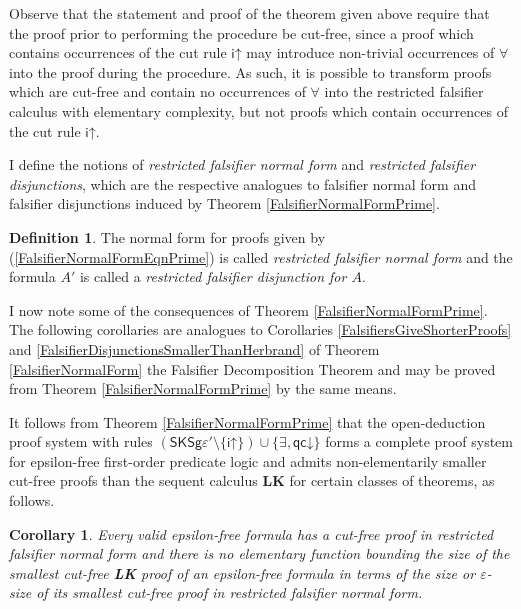 \documentclass[10pt]{article}
\newtheorem{corollary}[theorem]{Corollary}
\theoremstyle{definition}\newtheorem{remark}[theorem]{Remark}
\theoremstyle{definition}\newtheorem{example}[theorem]{Example}
\theoremstyle{definition}\newtheorem{definition}[theorem]{Definition}
\newcommand{\FalsifierCalculusPrime}{{\mathsf{SKSg\varepsilon'}}}
\newcommand{\iUp}{{\mathsf{i\mathord\uparrow}}}
\newcommand{\qcDown}{{\mathsf{qc\mathord\downarrow}}}
\begin{document}
	Observe that the statement and proof of the theorem given above require that the proof prior to performing the procedure be cut-free, since a proof which contains occurrences of the cut rule $\iUp$ may introduce non-trivial occurrences of $\forall$ into the proof during the procedure. As such, it is possible to transform proofs which are cut-free and contain no occurrences of $\forall$ into the restricted falsifier calculus with elementary complexity, but not proofs which contain occurrences of the cut rule $\iUp$.

	I define the notions of \textit{restricted falsifier normal form} and \textit{restricted falsifier disjunctions}, which are the respective analogues to falsifier normal form and falsifier disjunctions induced by Theorem \ref{FalsifierNormalFormPrime}.
	
	\begin{definition}\label{RestrictedFalsifierNormalForm}
		The normal form for proofs given by (\ref{FalsifierNormalFormEqnPrime}) is called \textit{restricted falsifier normal form} and the formula $A'$ is called a \textit{restricted falsifier disjunction for $A$}.
	\end{definition}

	I now note some of the consequences of Theorem \ref{FalsifierNormalFormPrime}. The following corollaries are analogues to Corollaries \ref{FalsifiersGiveShorterProofs} and \ref{FalsifierDisjunctionsSmallerThanHerbrand} of Theorem \ref{FalsifierNormalForm} the Falsifier Decomposition Theorem and may be proved from Theorem \ref{FalsifierNormalFormPrime} by the same means.
	
	It follows from Theorem \ref{FalsifierNormalFormPrime} that the open-deduction proof system with rules $(\FalsifierCalculusPrime \setminus \{\iUp\}) \cup \{\exists, \qcDown\}$ forms a complete proof system for epsilon-free first-order predicate logic and admits non-elementarily smaller cut-free proofs than the sequent calculus \textbf{LK} for certain classes of theorems, as follows.

	\begin{corollary}\label{FalsifiersGiveShorterProofs2}
		Every valid epsilon-free formula has a cut-free proof in restricted falsifier normal form and there is no elementary function bounding the size of the smallest cut-free \textbf{LK} proof of an epsilon-free formula in terms of the size or $\varepsilon$-size of its smallest cut-free proof in restricted falsifier normal form.
	\end{corollary}
\end{document}
